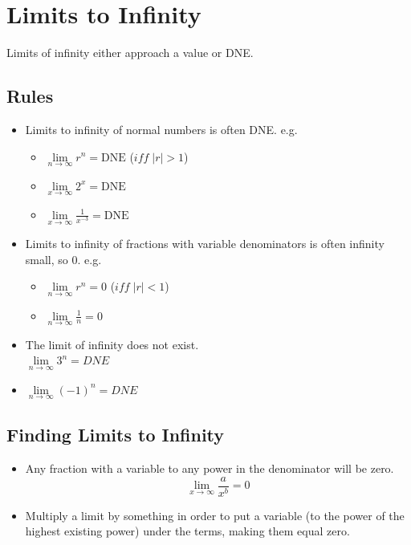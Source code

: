 \documentclass[a4paper,12pt]{article}
\begin{document}
\pagebreak

\section{Limits to Infinity}
Limits of infinity either approach a value or DNE.

\subsection{Rules}
\begin{itemize}
    \item{
        Limits to infinity of normal numbers is often DNE.
        e.g.
        \begin{itemize}
            \item{$\lim\limits_{n\to\infty}{r^n} = \textrm{DNE}$ ($i\!f\!\!f \;|r| > 1$)}
            \item{$\lim\limits_{x\to\infty}{2^x} = \textrm{DNE}$}
            \item{$\lim\limits_{x\to\infty}{\frac{1}{x^{-3}}} = \textrm{DNE}$}
        \end{itemize}
    }
    \item{
        Limits to infinity of fractions with variable denominators is often infinity small, so 0.
        e.g.
        \begin{itemize}
            \item{$\lim\limits_{n\to\infty}{r^n} = 0$ ($i\!f\!\!f \;|r| < 1$)}
            \item{$\lim\limits_{n\to\infty}{\frac{1}{n}} = 0$}
        \end{itemize}
    }
    \item{The limit of infinity does not exist. \\$\lim\limits_{n\to\infty}{3^n} = DNE$}
    \item{$\lim\limits_{n\to\infty}{(-1)^n} = DNE$}
\end{itemize}

\subsection{Finding Limits to Infinity}
\begin{itemize}
    \item{Any fraction with a variable to any power in the denominator will be zero. $$\lim\limits_{x\to\infty}{\frac{a}{x^b}} = 0$$}
    \item{Multiply a limit by something in order to put a variable (to the power of the highest existing power) under the terms, making them equal zero.}
\end{itemize}
\end{document}
